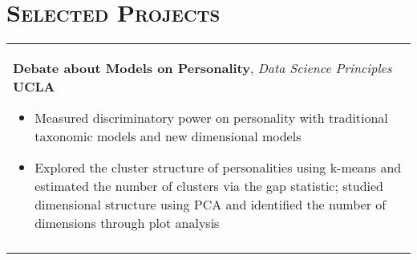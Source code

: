 \documentclass[a4paper,11pt]{article} %
\begin{document}
{%

\section{\Large\bf\textsc{Selected Projects}}
\begin{tabular}{p{18.5cm}}


{\bf{Debate about Models on Personality}}, {\it{Data Science Principles}} \hfill {\bf{UCLA}}
\begin{itemize}
\item Measured discriminatory power on personality with traditional taxonomic models and new dimensional models %
\item Explored the cluster structure of personalities using k-means and estimated the number of clusters via the gap statistic; studied dimensional structure using PCA and identified the number of dimensions through plot analysis\vspace*{-\baselineskip}
\end{itemize} \\
\vspace{.1mm}



\end{tabular}}
\end{document}
